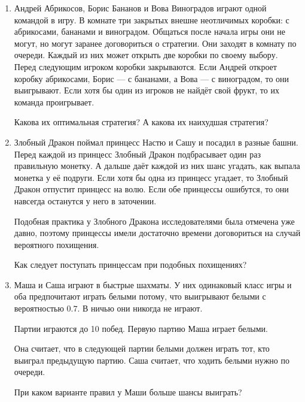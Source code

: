 \documentclass[12pt]{article}
\theoremstyle{definition}
\begin{document}
\begin{enumerate}
    \item Андрей Абрикосов, Борис Бананов и Вова Виноградов играют одной командой в игру.
    В комнате три закрытых внешне неотличимых коробки: с абрикосами, бананами и виноградом.
    Общаться после начала игры они не могут, но могут заранее договориться о стратегии.
    Они заходят в комнату по очереди.
    Каждый из них может открыть две коробки по своему выбору.
    Перед следующим игроком коробки закрываются. Если Андрей откроет коробку абрикосами,
    Борис — с бананами, а Вова — с виноградом, то они выигрывают.
    Если хотя бы один из игроков не найдёт свой фрукт, то их команда проигрывает.
    
  Какова их оптимальная стратегия? А какова их наихудшая стратегия?

  \item Злобный Дракон поймал принцесс Настю и Сашу и посадил в разные башни.
  Перед каждой из принцесс Злобный Дракон подбрасывает один раз правильную монетку.
  А дальше даёт каждой из них шанс угадать, как выпала монетка у её подруги.
  Если хотя бы одна из принцесс угадает, то Злобный Дракон отпустит принцесс на волю.
  Если обе принцессы ошибутся, то они навсегда останутся у него в заточении.
  
  Подобная практика у Злобного Дракона исследователями была отмечена уже давно,
  поэтому принцессы имели достаточно времени договориться на случай вероятного похищения.
  
  Как следует поступать принцессам при подобных похищениях?

  \item Маша и Саша играют в быстрые шахматы. У них одинаковый класс игры и
  оба предпочитают играть белыми потому, что выигрывают белыми с вероятностью $0.7$.
  В ничью они никогда не играют.

  Партии играются до 10 побед. Первую партию Маша играет белыми.
  
  Она считает, что в следующей партии белыми должен играть тот,
  кто выиграл предыдущую партию. Саша считает, что ходить белыми нужно по очереди.

  При каком варианте правил у Маши больше шансы выиграть?
    


\end{enumerate}
\end{document}
